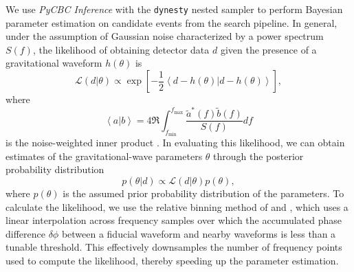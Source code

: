 We use \textit{PyCBC Inference} \cite{Biwer:2018osg} with the \texttt{dynesty} nested sampler \cite{Speagle_2020} to perform Bayesian parameter estimation on candidate events from the search pipeline. In general, under the assumption of Gaussian noise characterized by a power spectrum $S(f)$, the likelihood of obtaining detector data $d$ given the presence of a gravitational waveform $h(\theta)$ is
\begin{equation}
    \mathcal{L}(d|\theta)\propto\exp\left[-\frac{1}{2}\left<d-h(\theta)|d-h(\theta)\right>\right],
\end{equation}
where
\begin{equation}
    \left<a|b\right>=4\mathfrak{R}\int_{f_{\mathrm{min}}}^{f_{\mathrm{max}}}\frac{\tilde{a}^{*}(f)\tilde{b}(f)}{S(f)}df
\end{equation}
is the noise-weighted inner product \cite{Finn:1992xs,Chernoff:1993th}.
In evaluating this likelihood, we can obtain estimates of the gravitational-wave parameters $\theta$ through the posterior probability distribution
\begin{equation}
    p(\theta|d)\propto\mathcal{L}(d|\theta)p(\theta),
\end{equation}
where $p(\theta)$ is the assumed prior probability distribution of the parameters. To calculate the likelihood, we use the relative binning method of \cite{cornish2013fast} and \cite{Zackay:2018qdy}, which uses a linear interpolation across frequency samples over which the accumulated phase difference $\delta\phi$ between a fiducial waveform and nearby waveforms is less than a tunable threshold. This effectively downsamples the number of frequency points used to compute the likelihood, thereby speeding up the parameter estimation.

